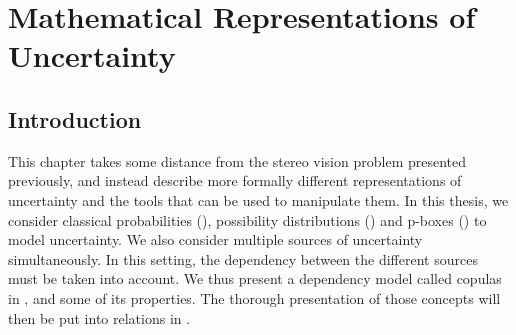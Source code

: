 \chapter{Mathematical Representations of Uncertainty}\label{chap:representation_of_uncertainty}

\section{Introduction}
This chapter takes some distance from the stereo vision problem presented previously, and instead describe more formally different representations of uncertainty and the tools that can be used to manipulate them. In this thesis, we consider classical probabilities (), possibility distributions () and p-boxes () to model uncertainty. We also consider multiple sources of uncertainty simultaneously. In this setting, the dependency between the different sources must be taken into account. We thus present a dependency model called copulas in , and some of its properties. The thorough presentation of those concepts will then be put into relations in . 

